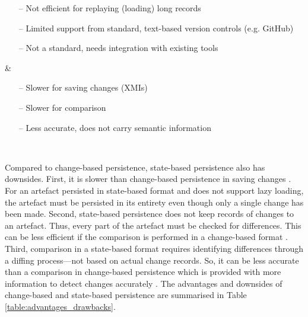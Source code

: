 \begin{table*}[h]
\begin{scriptsize}
\begin{tabular}
\begin{minipage}[t]{5cm}
\begin{itemize}[leftmargin=9pt]
          \item[--] Not efficient for replaying (loading) long records \cite{mens2002state}
          \item[--] Limited support from standard, text-based version controls (e.g. GitHub) \cite{koegel2010emfstore}
          \item[--] Not a standard, needs integration with existing tools \cite{koegel2010emfstore}
        \end{itemize}
      \end{minipage}
      &
      \begin{minipage}[t]{5cm}
        \raggedright
        \begin{itemize}[leftmargin=9pt]
          \setlength\itemsep{2pt}
          \item[--] Slower for saving changes (XMIs) \cite{mens2002state,daniel2016neoemf,DBLP:conf/models/Espinazo-PaganCM11}
          \item[--] Slower for comparison \cite{DBLP:conf/edoc/KoegelHLHD10}
          \item[--] Less accurate, does not carry semantic information \cite{mens2002state,DBLP:conf/edoc/KoegelHLHD10}
        \end{itemize}
      \end{minipage}
      \\
      \hline
    \end{tabular}
  \end{scriptsize}
\end{table*}

Compared to change-based persistence, state-based persistence also has downsides. First, it is slower than change-based persistence in saving changes \cite{mens2002state}. For an artefact persisted in state-based format and does not support lazy loading, the artefact must be persisted in its entirety even though only a single change has been made. Second, state-based persistence does not keep records of changes to an artefact. Thus, every part of the artefact must be checked for differences. This can be less efficient if the comparison is performed in a change-based format \cite{DBLP:conf/edoc/KoegelHLHD10}. Third, comparison in a state-based format requires identifying differences through a diffing process—not based on actual change records. So, it can be less accurate than a comparison in change-based persistence which is provided with more information to detect changes accurately \cite{mens2002state,DBLP:conf/edoc/KoegelHLHD10}. The advantages and downsides of change-based and state-based persistence are summarised in Table \ref{table:advantages_drawbacks}.

